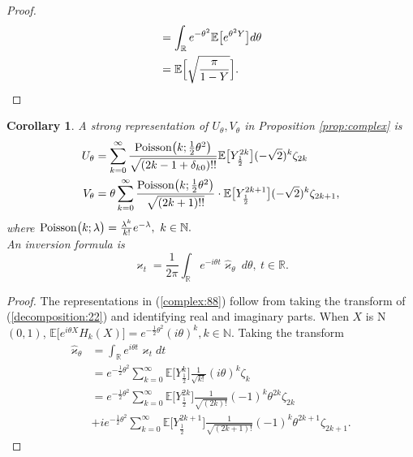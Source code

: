 \documentclass[preprint,11pt]{elsarticle}
\newtheorem{Corollary}{Corollary}
\theoremstyle{remark}
\begin{document}
{\begin{proof}
\begin{align*}
&=\int_{\mathbb{R}} e^{-\theta^2}\mathbb{E}\big [e^{\theta^2Y}\big ]d\theta\\
&= \mathbb{E}\Bigl [\sqrt { \frac{\pi}{1-Y} }\Bigr ].
\end{align*}
\end{proof}
%
\begin{Corollary}
A strong representation of $U_\theta, V_\theta$ in Proposition \ref{prop:complex} is
\begin{align}
U_\theta &= \sum_{k=0}^\infty
\frac{ \text{\rm Poisson}\big (k;\frac{1}{2}\theta^2\big ) 
 }
{ \sqrt{(2k-1+\delta_{k0})!!}  }
\mathbb{E}\big [Y_{\frac{1}{2}}^{2k}\big ](-\sqrt{2})^k  \zeta_{2k}
\nonumber\\
V_\theta &= \theta\sum_{k=0}^\infty
\frac{ \text{\rm Poisson}\big (k;\frac{1}{2}\theta^2\big )   }
{ \sqrt{(2k+1)!! } }
\cdot \mathbb{E}\big [Y_{\frac{1}{2}}^{2k+1}\big ](-\sqrt{2})^k \zeta_{2k+1},
\label{complex:88}
\end{align}
where 
$
\text{\rm Poisson}\big (k;\lambda\big ) = \frac{\lambda^k}{k!}e^{-\lambda},\ k \in \mathbb{N}.
$ \\[0.2cm]
An inversion formula is
\begin{equation}
\varkappa_t = \frac{1}{2\pi}\int_{\mathbb{R}}
e^{-i\theta t}\widehat{\varkappa}_\theta\ d\theta,\ t \in \mathbb{R}.
\label{inversion:23}
\end{equation}
\end{Corollary}
\begin{proof}
The representations in (\ref{complex:88}) follow from taking the transform of (\ref{decomposition:22})  and identifying real and imaginary parts. When $X$ is N$(0,1)$,
$
\mathbb{E}\big [e^{i\theta X}H_k(X)\big ]
 = e^{-\frac{1}{2}\theta^2}(i\theta)^k, k \in \mathbb{N}.
$
Taking the transform
\begin{align}
\widehat{\varkappa}_\theta & =\int_{\mathbb{R}}e^{i\theta t}\varkappa_tdt\nonumber\\
& = e^{-\frac{1}{2}\theta^2}
\sum_{k=0}^\infty 
\mathbb{E}\big [Y_{\frac{1}{2}}^k\big ]\frac{1}{\sqrt{k!}}(i\theta)^k\zeta_k\label{Poissonpf:01}\\
&= e^{-\frac{1}{2}\theta^2}\sum_{k=0}^\infty 
\mathbb{E}\big [Y_{\frac{1}{2}}^{2k}\big ]\frac{1}{\sqrt{(2k)!}}(-1)^k\theta^{2k}\zeta_{2k}\nonumber\\
&+ie^{-\frac{1}{2}\theta^2}\sum_{k=0}^\infty 
\mathbb{E}\big [Y_{\frac{1}{2}}^{2k+1}\big ]\frac{1}{\sqrt{(2k+1)!}}(-1)^k\theta^{2k+1}\zeta_{2k+1}.
\nonumber
\end{align}

\end{proof}}
\end{document}

